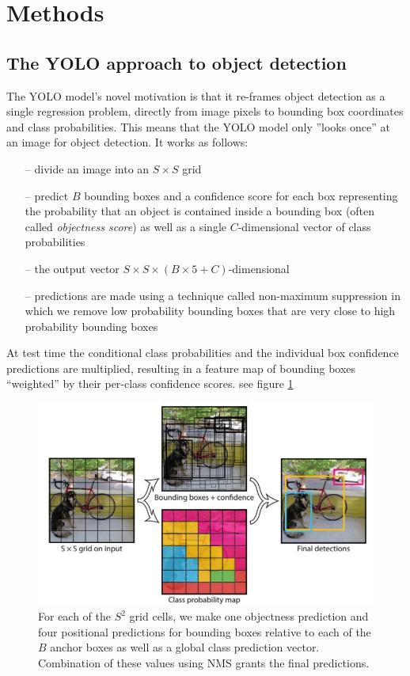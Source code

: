 \documentclass[a4paper]{article}
\begin{document}
\section{Methods}
\subsection*{The YOLO approach to object detection}
The YOLO model’s novel motivation is that it re-frames
object detection as a single regression problem, directly
from image pixels to bounding box coordinates and class
probabilities. This means that the YOLO model only ”looks
once” at an image for object detection.
It works as follows: 
\begin{itemize}
\item[--] divide an image into an $S\times S$ grid
\item[--]  predict $B$ bounding boxes and a confidence score for each box representing the probability that an object is contained inside a bounding box (often called \textit{objectness score}) as well as a single $C$-dimensional vector of class probabilities 
\item[--]  the output vector $S \times S \times (B\times 5 +C)$-dimensional
\item[--]  predictions are made using a technique called non-maximum suppression in which we remove low probability bounding boxes that are very close to high probability bounding boxes
\end{itemize}  At test time the conditional class probabilities and the individual box confidence predictions are multiplied, resulting in a feature map of bounding boxes ``weighted'' by their per-class confidence scores. see figure \ref{fig:yolo_model}
\begin{figure}
\label{fig:yolo_model}
\includegraphics[scale=0.35]{images/yolo_model}

\caption{For each of the $S^2$ grid cells, we make one objectness prediction and four positional predictions for bounding boxes relative to each of the $B$ anchor boxes as well as a global class prediction vector. Combination of these values using NMS grants the final predictions.}


\end{figure}
\end{document}

